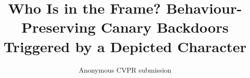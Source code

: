 \documentclass[10pt,twocolumn,letterpaper]{article}
\title{Who Is in the Frame? Behaviour-Preserving Canary Backdoors\\Triggered by a Depicted Character}
\author{Anonymous CVPR submission}
\begin{document}
\maketitle










% 
{
    \small
    
    
}
\end{document}
